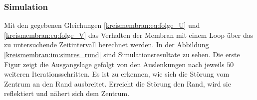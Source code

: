 \subsubsection{Simulation}
Mit den gegebenen Gleichungen \ref{kreismembran:eq:folge_U} und \ref{kreismembran:eq:folge_V} das Verhalten der Membran mit einem Loop über das zu untersuchende Zeitintervall berechnet werden. 
In der Abbildung \ref{kreismembran:im:simres_rund} sind Simulationsresultate zu sehen.
Die erste Figur zeigt die Ausgangslage gefolgt von den Auslenkungen nach jeweils $ 50 $ weiteren Iterationsschritten.
Es ist zu erkennen, wie sich die Störung vom Zentrum an den Rand ausbreitet.
Erreicht die Störung den Rand, wird sie reflektiert und nähert sich dem Zentrum. 
\begin{figure}
	
	\begin{center}
		

\end{center}
\end{figure}
